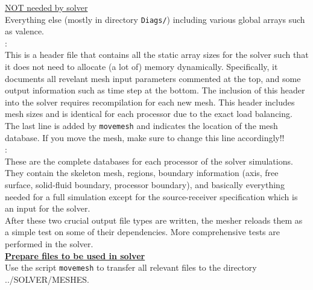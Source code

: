 \documentclass[11pt,letter,fleqn,english,notitlepage]{article}
\begin{document}
\noindent\underline{NOT needed by solver }\\
Everything else (mostly in directory {\tt Diags/}) including various global 
arrays such as valence.\\

: \\
This is a header file that contains all the static array sizes for the solver
such that it does not need to allocate (a lot of) memory dynamically.
Specifically, it documents all revelant mesh input parameters commented at the
top, and some output information such as time step at the bottom.  The
inclusion of this header into the solver requires recompilation for each new
mesh. This header includes mesh sizes and is identical for each processor due
to the exact load balancing.  The last line is added by {\tt movemesh} and
indicates the location of the mesh database. If you move the mesh, make sure to
change this line accordingly!!  \\

: \\
These are the complete databases for each processor of the solver simulations.
They contain the skeleton mesh, regions, boundary information (axis, free
surface, solid-fluid boundary, processor boundary), and basically everything
needed for a full simulation except for the source-receiver specification which
is an input for the solver. \\

\noindent After these two crucial output file types are written, the mesher
reloads them as a simple test on some of their dependencies. More comprehensive
tests are performed in the solver. \\

\noindent\textbf{\underline{Prepare files to be used in solver}}\\
Use the script {\tt movemesh} to transfer all relevant files to the directory ../SOLVER/MESHES. 
\end{document}
